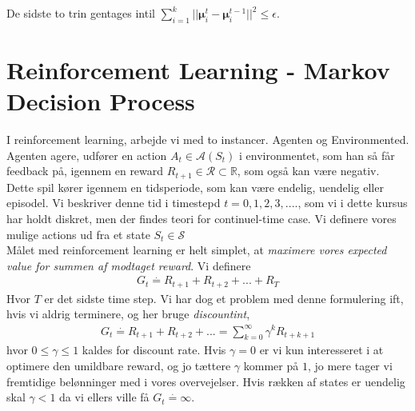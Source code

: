 \documentclass[paper=a4, fontsize=11pt]{scrartcl} %
\numberwithin{equation}{section} %
\numberwithin{figure}{section} %
\numberwithin{table}{section} %
\begin{document}
	De sidste to trin gentages intil $\sum_{i=1}^{k}||\mathbf{\mu}_i^t-\mathbf{\mu}_i^{t-1}||^2\leq\epsilon$.
	 
	\newpage
	
	\section*{Reinforcement Learning - Markov Decision Process}
	
	I reinforcement learning, arbejde vi med to instancer. Agenten og Environmented. Agenten agere, udfører en action $A_t\in\mathcal{A}(S_t)$ i environmentet, som han så får feedback på, igennem en reward $R_{t+1}\in\mathcal{R}\subset\mathbb{R}$, som også kan være negativ. Dette spil kører igennem en tidsperiode, som kan være endelig, uendelig eller episodel. Vi beskriver denne tid i timestepd $t=0,1,2,3,....$, som vi i dette kursus har holdt diskret, men der findes teori for continuel-time case. Vi definere vores mulige actions ud fra et state $S_t\in\mathcal{S}$ \\
	
	Målet med reinforcement learning er helt simplet, at \textit{maximere vores expected value for summen af modtaget reward}. Vi definere 
	\begin{align*}
	G_t\stackrel{\cdot}{=}R_{t+1}+R_{t+2}+...+R_{T}
	\end{align*}
	Hvor $T$ er det sidste time step. Vi har dog et problem med denne formulering ift, hvis vi aldrig terminere, og her bruge \textit{discountint}, 
	\begin{align*}
	G_t\stackrel{\cdot}{=}R_{t+1}+R_{t+2}+... =\sum_{k=0}^{\infty}\gamma^k R_{t+k+1}
	\end{align*}
	hvor $0\leq \gamma\leq1$ kaldes for discount rate. Hvis $\gamma=0$ er vi kun interesseret i at optimere den umildbare reward, og jo tættere $\gamma$ kommer på $1$, jo mere tager vi fremtidige belønninger med i vores overvejelser. Hvis rækken af states er uendelig skal $\gamma<1$ da vi ellers ville få $G_t\stackrel{\cdot}{=}\infty$. \\
	
\end{document}
